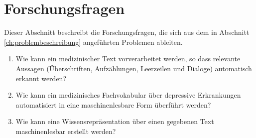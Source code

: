 \chapter{Forschungsfragen}
\label{ch:forschungsfragen}

Dieser Abschnitt beschreibt die Forschungsfragen, die sich aus dem in Abschnitt \ref{ch:problembeschreibung} angeführten Problemen ableiten.


\begin{enumerate}[label=FF \arabic*]
\item Wie kann ein medizinischer Text vorverarbeitet werden, so dass relevante Aussagen (Überschriften, Aufzählungen, Leerzeilen und Dialoge) automatisch erkannt werden?
\item Wie kann ein medizinisches Fachvokabular über depressive Erkrankungen automatisiert in eine maschinenlesbare Form überführt werden?
\item Wie kann eine Wissensrepräsentation über einen gegebenen Text maschinenlesbar erstellt werden?
\end{enumerate}



